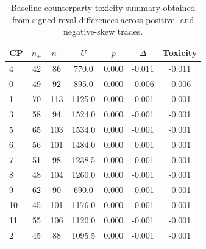 \begin{table}[t]
\centering
\small
\begin{tabular}{lcccccc}
\toprule
CP & $n_{+}$ & $n_{-}$ & $U$ & $p$ & $\Delta$ & Toxicity \\
\midrule
4 & 42 & 86 & 770.0 & 0.000 & -0.011 & -0.011 \\
0 & 49 & 92 & 895.0 & 0.000 & -0.006 & -0.006 \\
1 & 70 & 113 & 1125.0 & 0.000 & -0.001 & -0.001 \\
3 & 58 & 94 & 1524.0 & 0.000 & -0.001 & -0.001 \\
5 & 65 & 103 & 1534.0 & 0.000 & -0.001 & -0.001 \\
6 & 56 & 101 & 1484.0 & 0.000 & -0.001 & -0.001 \\
7 & 51 & 98 & 1238.5 & 0.000 & -0.001 & -0.001 \\
8 & 48 & 104 & 1260.0 & 0.000 & -0.001 & -0.001 \\
9 & 62 & 90 & 690.0 & 0.000 & -0.001 & -0.001 \\
10 & 45 & 101 & 1176.0 & 0.000 & -0.001 & -0.001 \\
11 & 55 & 106 & 1120.0 & 0.000 & -0.001 & -0.001 \\
2 & 45 & 88 & 1095.5 & 0.000 & -0.001 & -0.001 \\
\bottomrule
\end{tabular}
\caption{Baseline counterparty toxicity summary obtained from signed reval differences across positive- and negative-skew trades.}
\label{tab:counterparty_toxicity_baseline}
\end{table}

